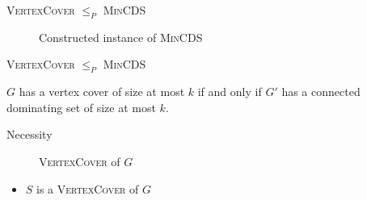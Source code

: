 \documentclass{beamer}
\begin{document}
\begin{frame}{\textsc{VertexCover} $\leq_{P}$ \textsc{MinCDS}}
    \begin{figure}
      \caption{Constructed instance of \textsc{MinCDS}}
    \end{figure}

\end{frame}

\begin{frame}{\textsc{VertexCover} $\leq_{P}$ \textsc{MinCDS}}
    \begin{lemma}
        $G$ has a vertex cover of size at most $k$ if and only if $G'$ has a connected dominating set of size at most $k$.
    \end{lemma}
\end{frame}

\begin{frame}{Necessity}
\begin{figure}
      \caption{\textsc{VertexCover} of $G$}
    \end{figure}
    \begin{itemize}
        \item $S$ is a \textsc{VertexCover} of $G$
    \end{itemize}
\end{frame}
\end{document}
